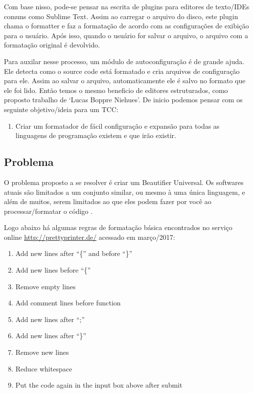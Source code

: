     Com base nisso, pode-se pensar na escrita de plugins para editores de texto/IDEs comuns como
    Sublime Text. Assim ao carregar o arquivo do disco, este plugin chama o formatter e faz a
    formatação de acordo com as configurações de exibição para o usuário. Após isso, quando o
    usuário for salvar o arquivo, o arquivo com a formatação original é devolvido.

    Para auxilar nesse processo, um módulo de autoconfiguração é de grande ajuda. Ele detecta como o
    source code está formatado e cria arquivos de configuração para ele. Assim ao salvar o arquivo,
    automaticamente ele é salvo no formato que ele foi lido. Então temos o mesmo beneficio de
    editores estruturados, como proposto trabalho de `Lucas Boppre Niehues'. De inicio podemos
    pensar com os seguinte objetivo/ideia para um TCC:

    \medskip
    \begin{myquote}
    \begin{enumerate}[nolistsep]
        \item Criar um formatador de fácil configuração e expansão para todas as linguagens de
              programação existem e que irão existir.
    \end{enumerate}
    \end{myquote}



\subsection{Problema}

    O problema proposto a se resolver é criar um Beautifier Universal. Os softwares atuais são
    limitados a um conjunto similar, ou mesmo à uma única linguagem, e além de muitos, serem
    limitados ao que eles podem fazer por você ao processar/formatar o código \cite{Terence}.

    Logo abaixo há algumas regras de formatação básica encontrados no serviço online
    \url{http://prettyprinter.de/} acessado em março/2017:

    \medskip
    \begin{myquote}
    \begin{enumerate}[nolistsep]
        \item Add new lines after ``\{'' and before ``\}''
        \item Add new lines before ``\{''
        \item Remove empty lines
        \item Add comment lines before function
        \item Add new lines after ``;''
        \item Add new lines after ``\}''
        \item Remove new lines
        \item Reduce whitespace
        \item Put the code again in the input box above after submit
    \end{enumerate}
    \end{myquote}


